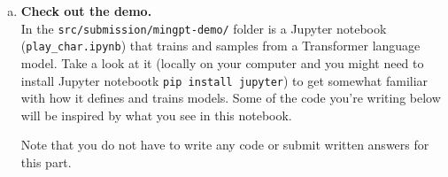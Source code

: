 \begin{enumerate}[(a)]
\item {} \textbf{Check out the demo.}\\
In  the \texttt{src/submission/mingpt-demo/} folder is a Jupyter notebook (\texttt{play\_char.ipynb}) that trains and samples from a Transformer language model.
Take a look at it (locally on your computer and you might need to install Jupyter notebootk \texttt{pip install jupyter}) to get somewhat familiar with how it defines and trains models.
Some of the code you're writing below will be inspired by what you see in this notebook.

Note that you do not have to write any code or submit written answers for this part.




\end{enumerate}
